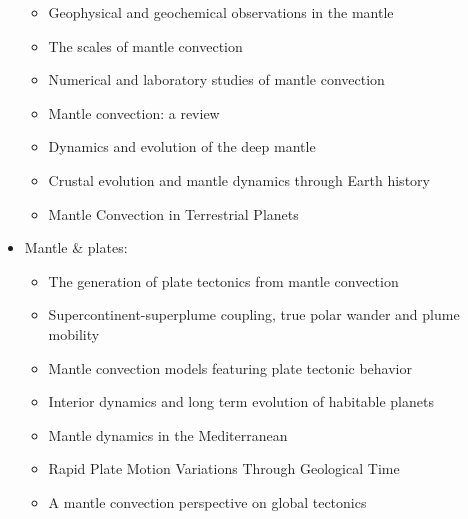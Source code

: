 \begin{itemize}
   \begin{itemize}
   \item [\nineteenninetytwo] Geophysical and geochemical observations in the mantle \cite{dari92}
   \item [\nineteenninetyeight] The scales of mantle convection \cite{ande98}
   \item [\twothousandfive] Numerical and laboratory studies of mantle convection \cite{taxn05}
   \item [\twothousandeight] Mantle convection: a review \cite{ogaw08}
   \item [\twothousandtwelve] Dynamics and evolution of the deep mantle  \cite{tack12}
   \item [\twothousandeighteen] Crustal evolution and mantle dynamics through Earth history \cite{kore18}
   \item [\twothousandtwenty] Mantle Convection in Terrestrial Planets \cite{mube20}
   \end{itemize}

\item Mantle \& plates:
   \begin{itemize}
   \item [\twothousandthree] The generation of plate tectonics from mantle convection \cite{berc03}
   \item [\twothousandnine] Supercontinent-superplume coupling, true polar wander and plume mobility \cite{lizh09}
   \item [\twothousandeleven] Mantle convection models featuring plate tectonic behavior \cite{lowm11}
   \item [\twothousandtwelve] Interior dynamics and long term evolution of habitable planets \cite{taab12}
   \item [\twothousandfourteen] Mantle dynamics in the Mediterranean \cite{faba14}
   \item [\twothousandfifteen] Rapid Plate Motion Variations Through Geological Time \cite{iabu15}
   \item [\twothousandseventeen] A mantle convection perspective on global tectonics \cite{cogu17}
   \end{itemize}


\end{itemize}
